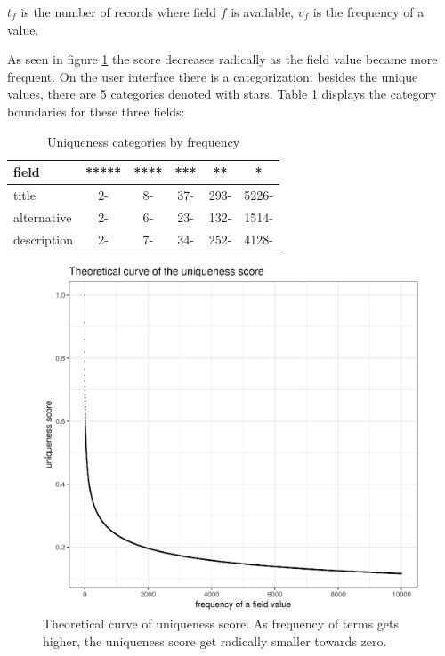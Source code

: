 $t_f$ is the number of records where field $f$ is available, $v_f$ is the frequency of a value.

As seen in figure \ref{fig:uniqueness-theoretical} the score decreases radically as the field value became more frequent. On the user interface there is a categorization: besides the unique values, there are 5 categories denoted with stars. Table \ref{table:uniqueness-boundaries} displays the category boundaries for these three fields:

\begin{table}
\caption{Uniqueness categories by frequency}
\label{table:uniqueness-boundaries}
\centering
\begin{tabular}{l|c|c|c|c|c}
field & ***** & **** & *** & ** & * \\
\hline
title & 2- & 8- & 37- & 293- & 5226- \\
alternative & 2- & 6- & 23- & 132- & 1514- \\
description & 2- & 7- & 34- & 252- & 4128-
\end{tabular}
\end{table}

\begin{figure}[ht]
\includegraphics[width=\textwidth]{images/chapter02/uniqueness-theoretical.eps}
\centering
\caption{Theoretical curve of uniqueness score. As frequency of terms gets higher, the uniqueness score get radically smaller towards zero.}
\label{fig:uniqueness-theoretical}
\end{figure}

